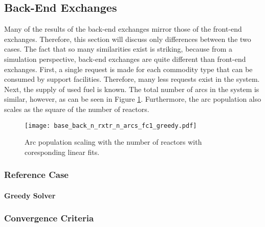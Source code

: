\subsection{Back-End Exchanges}

Many of the results of the back-end exchanges mirror those of the front-end
exchanges. Therefore, this section will discuss only differences between the two
cases. The fact that so many similarities exist is striking, because from a
simulation perspective, back-end exchanges are quite different than front-end
exchanges. First, a single request is made for each commodity type that can be
consumed by support facilities. Therefore, many less requests exist in the
system. Next, the supply of used fuel is known. The total number of arcs in the
system is similar, however, as can be seen in Figure
\ref{fig:base_back_n_rxtr_n_arcs_fc1_greedy}. Furthermore, the arc
population also scales as the square of the number of reactors.

\begin{figure}[h!]
  \begin{center}
    \texttt{[image: base\_back\_n\_rxtr\_n\_arcs\_fc1\_greedy.pdf]}
    \caption[]{
      \label{fig:base_back_n_rxtr_n_arcs_fc1_greedy}
      Arc population scaling with the number of reactors with coresponding linear fits.}
  \end{center}
\end{figure}

\subsubsection{Reference Case}

\paragraph{Greedy Solver}







\subsubsection{Convergence Criteria}
